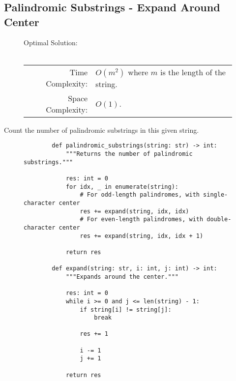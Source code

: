 
\subsection{Palindromic Substrings - Expand Around Center}

\begin{figure}[H]
    Optimal Solution:\\\\
    \begin{tabular}{rl}
        Time Complexity:& \(O(m^2)\) where \(m\) is the length of the string.\\
        Space Complexity:& \(O(1)\).
    \end{tabular}
\end{figure}

Count the number of palindromic substrings in this given string.

\begin{figure}[H]
    \centering
    \begin{verbatim}
        def palindromic_substrings(string: str) -> int:
            """Returns the number of palindromic substrings."""

            res: int = 0
            for idx, _ in enumerate(string):
                # For odd-length palindromes, with single-character center
                res += expand(string, idx, idx)
                # For even-length palindromes, with double-character center
                res += expand(string, idx, idx + 1)

            return res

        def expand(string: str, i: int, j: int) -> int:
            """Expands around the center."""

            res: int = 0
            while i >= 0 and j <= len(string) - 1:
                if string[i] != string[j]:
                    break

                res += 1

                i -= 1
                j += 1

            return res
    \end{verbatim}
\end{figure}
